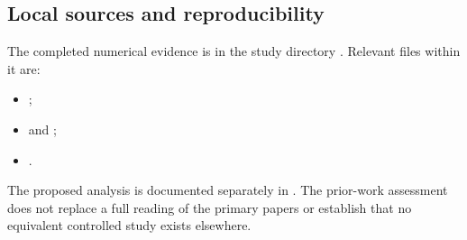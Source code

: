 \documentclass[11pt,a4paper]{article}
\begin{document}
\subsection*{Local sources and reproducibility}
The completed numerical evidence is in the study directory
. Relevant files within it are:
\begin{itemize}
\item {};
\item {} and ;
\item {}.
\end{itemize}
The proposed analysis is documented separately in
.
The prior-work assessment does not replace a full reading of the primary
papers or establish that no equivalent controlled study exists elsewhere.
\end{document}
